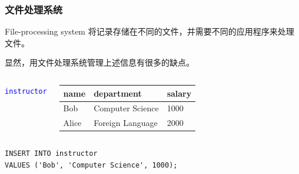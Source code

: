 \documentclass[aspectratio=169, 14pt]{beamer}
\begin{document}
\begin{frame}
    \frametitle{文件处理系统}

    \begin{block}{File-processing system}
        将记录存储在不同的文件，并需要不同的应用程序来处理文件。        
    \end{block}
    显然，用文件处理系统管理上述信息有很多的缺点。
\end{frame}

\begin{frame}[fragile]

    \begin{columns}
        {\large \textcolor{blue}{\texttt{instructor}}}

\begin{table}
    \begin{tabular}{lll}
      \toprule
      name & department & salary \\
      \midrule
      Bob & Computer Science & 1000 \\
      Alice & Foreign Language & 2000 \\
      \bottomrule
    \end{tabular}
\end{table}
    \end{columns}
\begin{verbatim}
INSERT INTO instructor
VALUES ('Bob', 'Computer Science', 1000);
\end{verbatim}
\end{frame}
\end{document}
